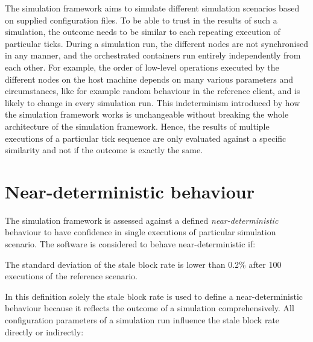 The simulation framework aims to simulate different simulation scenarios based on supplied configuration files.
To be able to trust in the results of  such a simulation, the outcome needs to be similar to each repeating execution of particular ticks.
During a simulation run, the different nodes are not synchronised in any manner, and the orchestrated containers run entirely independently from each other.
For example, the order of low-level operations executed by the different nodes on the host machine depends on many various parameters and circumstances, like for example random behaviour in the reference client, and is likely to change in every simulation run.
This indeterminism introduced by how the simulation framework works is unchangeable without breaking the whole architecture of the simulation framework.
Hence, the results of multiple executions of a particular tick sequence are only  evaluated against a specific similarity and not if the outcome is exactly the same.

\section{Near-deterministic behaviour} \label{chap:near-deterministic_behaviour}

The simulation framework is assessed against a defined \emph{near-deterministic} behaviour to have confidence in single executions of particular simulation scenario.
The software is considered to behave near-deterministic if:

The standard deviation of the stale block rate is lower than 0.2\% after 100 executions of the reference scenario.

In this definition solely the stale block rate is used to define a near-deterministic behaviour because it reflects the outcome of a simulation comprehensively.
All configuration parameters of a simulation run influence the stale block rate directly or indirectly\cite{gervais2016security}:

